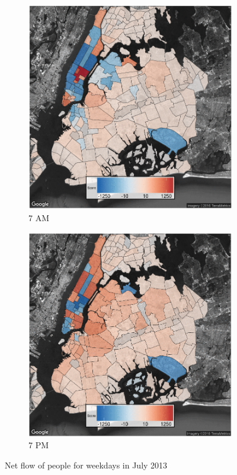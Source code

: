 \documentclass[twocolumn]{article}
\begin{document}
\begin{figure}[t]
 
\begin{subfigure}{0.24\textwidth}
\centering
 \includegraphics[width=1\linewidth]{7am} 
 \caption{7 AM}
 \label{fig:7am}
\end{subfigure}
 \begin{subfigure}{0.24\textwidth}
 \centering
\includegraphics[width=1\linewidth]{7pm}
 \caption{7 PM} 
 \label{fig:7pm}
\end{subfigure}
 
\caption{Net flow of people for weekdays in July 2013}
\label{fig:flow}
\end{figure}
\end{document}
